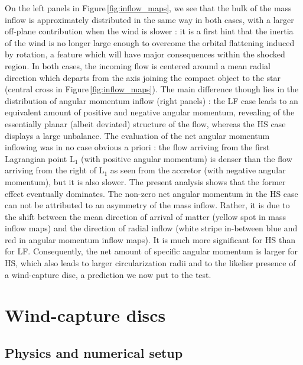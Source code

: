\documentclass{aa}
\begin{document}
On the left panels in Figure\,\ref{fig:inflow_maps}, we see that the bulk of the mass inflow is approximately distributed in the same way in both cases, with a larger off-plane contribution when the wind is slower : it is a first hint that the inertia of the wind is no longer large enough to overcome the orbital flattening induced by rotation, a feature which will have major consequences within the shocked region. In both cases, the incoming flow is centered around a mean radial direction which departs from the axis joining the compact object to the star (central cross in Figure\,\ref{fig:inflow_maps}). The main difference though lies in the distribution of angular momentum inflow (right panels) : the LF case leads to an equivalent amount of positive and negative angular momentum, revealing of the essentially planar (albeit deviated) structure of the flow, whereas the HS case displays a large unbalance. The evaluation of the net angular momentum inflowing was in no case obvious a priori : the flow arriving from the first Lagrangian point L$_1$ (with positive angular momentum) is denser than the flow arriving from the right of L$_1$ as seen from the accretor (with negative angular momentum), but it is also slower. The present analysis shows that the former effect eventually dominates. The non-zero net angular momentum in the HS case can not be attributed to an asymmetry of the mass inflow. Rather, it is due to the shift between the mean direction of arrival of matter (yellow spot in mass inflow maps) and the direction of radial inflow (white stripe in-between blue and red in angular momentum inflow maps). It is much more significant for HS than for LF. Consequently, the net amount of specific angular momentum is larger for HS, which also leads to larger circularization radii and to the likelier presence of a wind-capture disc, a prediction we now put to the test.

\section{Wind-capture discs}
\label{sec:wind-capt_discs}

\subsection{Physics and numerical setup}
\label{sec:HD}
\end{document}
